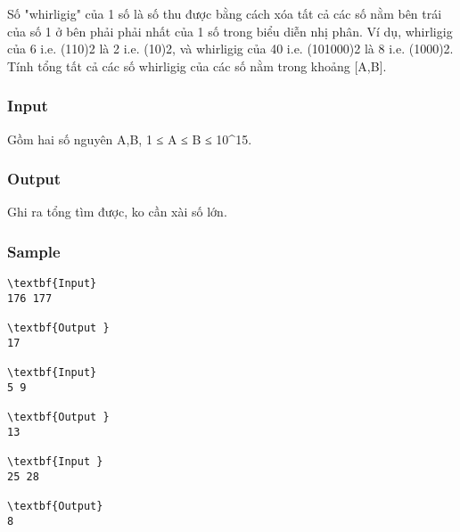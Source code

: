 

Số "whirligig" của 1 số là số thu được bằng cách xóa tất cả các số nằm bên trái của số 1 ở bên phải phải nhất của 1 số trong biểu diễn nhị phân. Ví dụ, whirligig của 6 i.e. (110)2 là 2 i.e. (10)2, và whirligig của 40 i.e. (101000)2 là 8 i.e. (1000)2. Tính tổng tất cả các số whirligig của các số nằm trong khoảng [A,B].

\subsubsection{Input}

Gồm hai số nguyên A,B, 1 ≤ A ≤ B ≤ 10\textasciicircum15. 

\subsubsection{Output}

Ghi ra tổng tìm được, ko cần xài số lớn.

\subsubsection{Sample}
\begin{verbatim}
\textbf{Input} 
176 177
 
\textbf{Output }
17 

\textbf{Input} 
5 9 
 
\textbf{Output } 
13 

\textbf{Input } 
25 28 
 
\textbf{Output}
8 

\end{verbatim}